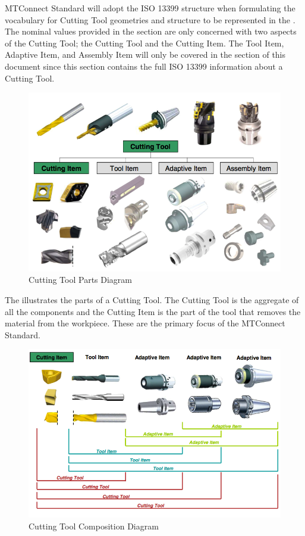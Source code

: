 MTConnect Standard will adopt the ISO 13399 structure when formulating the vocabulary for Cutting Tool geometries and structure to be represented in the . The nominal values provided in the  section are only concerned with two aspects of the Cutting Tool; the Cutting Tool and the Cutting Item. The Tool Item, Adaptive Item, and Assembly Item will only be covered in the  section of this document since this section contains the full ISO 13399 information about a Cutting Tool.

\begin{figure}[ht]
  \centering
    \includegraphics[width=1.0\textwidth]{figures/Cutting Tool Parts.png}
  \caption{Cutting Tool Parts Diagram}
  \label{fig:Cutting Tool Parts Diagram}
\end{figure}

\FloatBarrier


The  illustrates the parts of a Cutting Tool. The Cutting Tool is the aggregate of all the components and the Cutting Item is the part of the tool that removes the material from the workpiece. These are the primary focus of the MTConnect Standard.

\begin{figure}[ht]
  \centering
    \includegraphics[width=1.0\textwidth]{figures/Cutting Tool Composition.png}
  \caption{Cutting Tool Composition Diagram}
  \label{fig:Cutting Tool Composition Diagram}
\end{figure}

